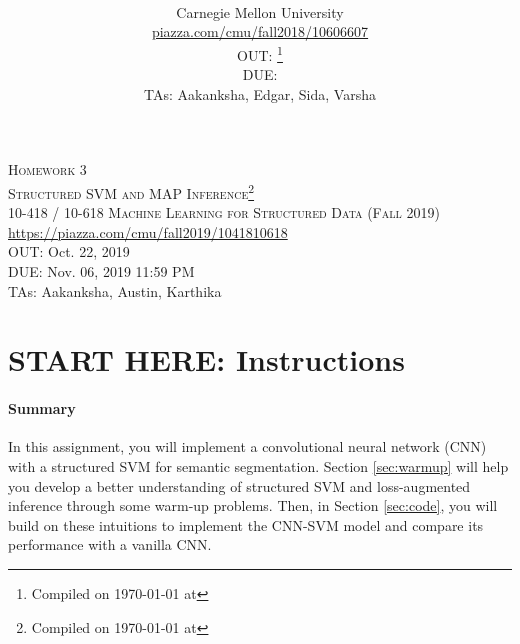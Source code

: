 \documentclass[11pt,addpoints,answers]{exam}
\title{\textsc{\hwName}} %
\author{\courseName\\
  Carnegie Mellon University \\
\url{piazza.com/cmu/fall2018/10606607} \\
OUT: \outDate{}\thanks{Compiled on \today{} at \currenttime{}} \\
DUE: \dueDate{} \\ 
TAs: Aakanksha, Edgar, Sida, Varsha}
\date{}
\date{}
\numberwithin{equation}{section} %
\numberwithin{figure}{section} %
\numberwithin{table}{section} %
\newcommand{\courseNum}{10-418 / 10-618}
\newcommand{\courseName}{Machine Learning for Structured Data}
\newcommand{\courseSem}{Fall 2019}
\newcommand{\piazzaUrl}{\url{https://piazza.com/cmu/fall2019/1041810618}}
\newcommand{\hwNum}{Homework 3}
\newcommand{\hwTopic}{Structured SVM and MAP Inference}
\newcommand{\outDate}{Oct. 22, 2019}
\newcommand{\dueDate}{Nov. 06, 2019 11:59 PM}
\newcommand{\taNames}{Aakanksha, Austin, Karthika}
\begin{document}
\section*{}
\begin{center}
  \textsc{\LARGE \hwNum} \\
  \textsc{\LARGE \hwTopic\footnote{Compiled on \today{} at \currenttime{}}} \\
  \vspace{1em}
  \textsc{\large \courseNum{} \courseName{} (\courseSem)} \\
  \piazzaUrl\\
  \vspace{1em}
  OUT: \outDate \\
  DUE: \dueDate \\
  TAs: \taNames
\end{center}


\section*{START HERE: Instructions}

\begin{notebox}
\paragraph{Summary} In this assignment, you will implement a convolutional neural network (CNN) with a structured SVM for semantic segmentation. Section \ref{sec:warmup} will help you develop a better understanding of structured SVM and loss-augmented inference through some warm-up problems. Then, in Section \ref{sec:code}, you will build on these intuitions to implement the CNN-SVM model and compare its performance with a vanilla CNN.
\end{notebox}
\end{document}
